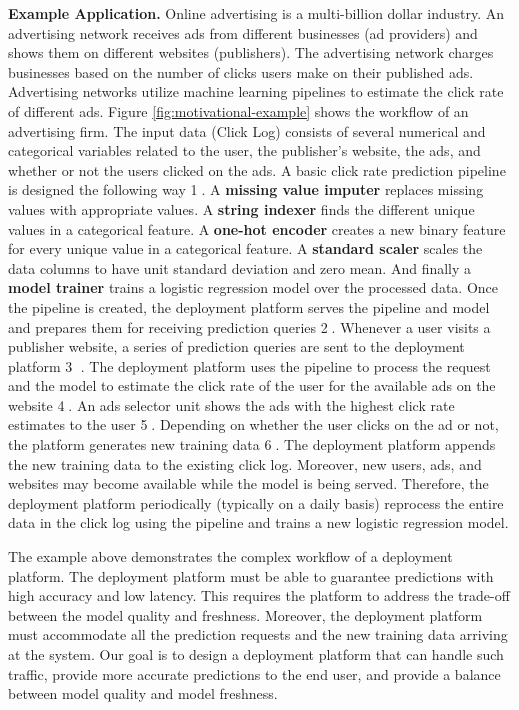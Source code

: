 \textbf{Example Application.} 
Online advertising is a multi-billion dollar industry.
An advertising network receives ads from different businesses (ad providers) and shows them on different websites (publishers).
The advertising network charges businesses based on the number of clicks users make on their published ads.
Advertising networks utilize machine learning pipelines to estimate the click rate of different ads.
Figure \ref{fig:motivational-example} shows the workflow of an advertising firm.
The input data (Click Log) consists of several numerical and categorical variables related to the user, the publisher's website, the ads, and whether or not the users clicked on the ads.
A basic click rate prediction pipeline is designed the following way \textcircled{1}. 
A \textbf{missing value imputer} replaces missing values with appropriate values.
A \textbf{string indexer} finds the different unique values in a categorical feature. 
A \textbf{one-hot encoder} creates a new binary feature for every unique value in a categorical feature.
A \textbf{standard scaler} scales the data columns to have unit standard deviation and zero mean.
And finally a \textbf{model trainer} trains a logistic regression model over the processed data.
Once the pipeline is created, the deployment platform serves the pipeline and model and prepares them for receiving prediction queries \textcircled{2}.
Whenever a user visits a publisher website, a series of prediction queries are sent to the deployment platform \textcircled{3} .
The deployment platform uses the pipeline to process the request and the model to estimate the click rate of the user for the available ads on the website \textcircled{4}.
An ads selector unit shows the ads with the highest click rate estimates to the user \textcircled{5}.
Depending on whether the user clicks on the ad or not, the platform generates new training data \textcircled{6}.
The deployment platform appends the new training data to the existing click log.
Moreover, new users, ads, and websites may become available while the model is being served.
Therefore, the deployment platform periodically (typically on a daily basis) reprocess the entire data in the click log using the pipeline and trains a new logistic regression model.

The example above demonstrates the complex workflow of a deployment platform.
The deployment platform must be able to guarantee predictions with high accuracy and low latency.
This requires the platform to address the trade-off between the model quality and freshness.
Moreover, the deployment platform must accommodate all the prediction requests and the new training data arriving at the system. 
Our goal is to design a deployment platform that can handle such traffic, provide more accurate predictions to the end user, and provide a balance between model quality and model freshness.

